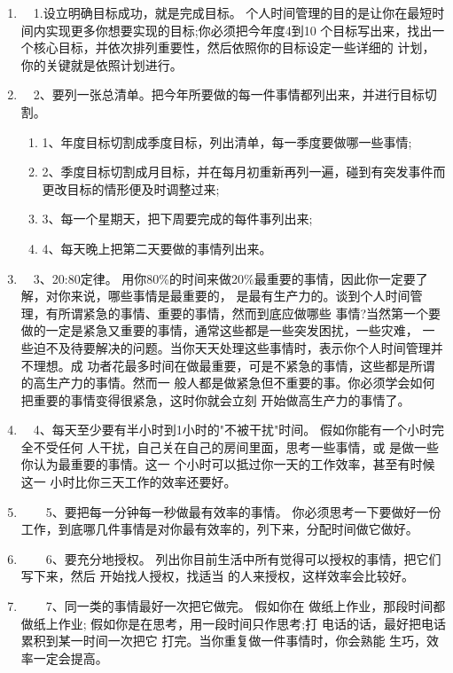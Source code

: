 \documentclass[11pt]{ctexart}
\begin{document}
\begin{enumerate}
\item 　1.设立明确目标成功，就是完成目标。
\label{sec:orgheadline38}
个人时间管理的目的是让你在最短时间内实现更多你想要实现的目标;你必须把今年度4到10
个目标写出来，找出一个核心目标，并依次排列重要性，然后依照你的目标设定一些详细的
计划，你的关键就是依照计划进行。


\item 　2、要列一张总清单。把今年所要做的每一件事情都列出来，并进行目标切割。
\label{sec:orgheadline43}

\begin{enumerate}
\item 1、年度目标切割成季度目标，列出清单，每一季度要做哪一些事情;
\label{sec:orgheadline39}

\item 2、季度目标切割成月目标，并在每月初重新再列一遍，碰到有突发事件而更改目标的情形便及时调整过来;
\label{sec:orgheadline40}

\item 3、每一个星期天，把下周要完成的每件事列出来;
\label{sec:orgheadline41}

\item 4、每天晚上把第二天要做的事情列出来。
\label{sec:orgheadline42}
\end{enumerate}

\item 　3、20:80定律。
\label{sec:orgheadline44}
用你80\%的时间来做20\%最重要的事情，因此你一定要了解，对你来说，哪些事情是最重要的，
是最有生产力的。谈到个人时间管理，有所谓紧急的事情、重要的事情，然而到底应做哪些
事情?当然第一个要做的一定是紧急又重要的事情，通常这些都是一些突发困扰，一些灾难，
一些迫不及待要解决的问题。当你天天处理这些事情时，表示你个人时间管理并不理想。成
功者花最多时间在做最重要，可是不紧急的事情，这些都是所谓的高生产力的事情。然而一
般人都是做紧急但不重要的事。你必须学会如何把重要的事情变得很紧急，这时你就会立刻
开始做高生产力的事情了。


\item 　4、每天至少要有半小时到1小时的"不被干扰"时间。
\label{sec:orgheadline45}
假如你能有一个小时完全不受任何 人干扰，自己关在自己的房间里面，思考一些事情，或
是做一些你认为最重要的事情。这一 个小时可以抵过你一天的工作效率，甚至有时候这一
小时比你三天工作的效率还要好。


\item 　　5、要把每一分钟每一秒做最有效率的事情。
\label{sec:orgheadline46}
你必须思考一下要做好一份工作，到底哪几件事情是对你最有效率的，列下来，分配时间做它做好。

\item 　　6、要充分地授权。
\label{sec:orgheadline47}
列出你目前生活中所有觉得可以授权的事情，把它们写下来，然后 开始找人授权，找适当
的人来授权，这样效率会比较好。


\item 　　7、同一类的事情最好一次把它做完。
\label{sec:orgheadline48}
假如你在 做纸上作业，那段时间都做纸上作业; 假如你是在思考，用一段时间只作思考;打
电话的话，最好把电话累积到某一时间一次把它 打完。当你重复做一件事情时，你会熟能
生巧，效率一定会提高。
\end{enumerate}
\end{document}

